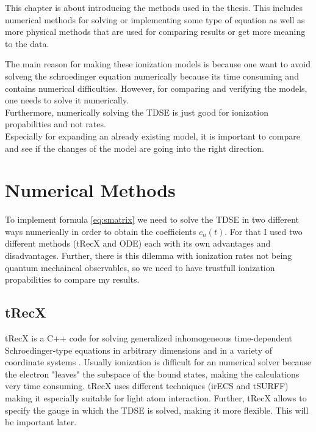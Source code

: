 This chapter is about introducing the methods used in the thesis.
This includes numerical methods for solving or implementing some type of equation as well as more physical methods that are used for comparing results or get more meaning to the data.

The main reason for making these ionization models is because one want to avoid solveng the schroedinger equation numerically because its time consuming and contains numerical difficulties.
However, for comparing and verifying the models, one needs to solve it numerically.\\
Furthermore, numerically solving the TDSE is just good for ionization propabilities and not rates.\\
Especially for expanding an already existing model, it is important to compare and see if the changes of the model are going into the right direction.



\section{Numerical Methods}
To implement formula \ref{eq:smatrix} we need to solve the TDSE in two different ways numerically in order to obtain the coefficients $c_n(t)$. 
For that I used two different methods (tRecX and ODE) each with its own advantages and disadvantages.
Further, there is this dilemma with ionization rates not being quantum mechaincal observables, so we need to have trustfull ionization propabilities to compare my results.



\subsection{tRecX}
tRecX is a C++ code for solving generalized inhomogeneous time-dependent
Schroedinger-type equations in arbitrary dimensions and in a variety of coordinate systems \cite{Scrinzi_trecx}.
Usually ionization is difficult for an numerical solver because the electron "leaves" the subspace of the bound states, making the calculations very time consuming.
tRecX uses different techniques (irECS and tSURFF) making it especially suitable for light atom interaction. 
Further, tRecX allows to specify the gauge in which the TDSE is solved, making it more flexible. 
This will be important later.

